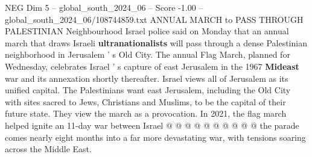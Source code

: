 \begin{textsample}{NEG Dim 5 – global\_south\_2024\_06 – Score -1.00 – global\_south\_2024\_06/108744859.txt}
ANNUAL MARCH to PASS THROUGH PALESTINIAN Neighbourhood Israel police said on Monday that an annual march that draws Israeli \textbf{ultranationalists} will pass through a dense Palestinian neighborhood in Jerusalem ' s Old City.
The annual Flag March, planned for Wednesday, celebrates Israel ' s capture of east Jerusalem in the 1967 \textbf{Mideast} war and its annexation shortly thereafter.
Israel views all of Jerusalem as its unified capital.
The Palestinians want east Jerusalem, including the Old City with sites sacred to Jews, Christians and Muslims, to be the capital of their future state.
They view the march as a provocation.
In 2021, the flag march helped ignite an 11-day war between Israel @ @ @ @ @ @ @ @ @ @ the parade comes nearly eight months into a far more devastating war, with tensions soaring across the Middle East.

\end{textsample}
